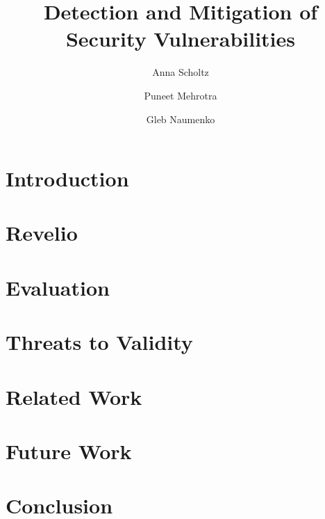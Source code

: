\documentclass[sigconf]{acmart}
\begin{document}
\title{Detection and Mitigation of Security Vulnerabilities}


\author{Anna Scholtz}


\author{Puneet Mehrotra}


\author{Gleb Naumenko}




\begin{abstract}

\end{abstract}





\maketitle

\section{Introduction}
\label{sec:introduction}


\section{Revelio}
\label{sec:revelio}


\section{Evaluation}
\label{sec:evaluation}



\section{Threats to Validity}
\label{sec:threats}



\section{Related Work}
\label{sec:related-work}


\section{Future Work}
\label{sec:future-work}



\section{Conclusion}
\label{sec:conclusion}




\end{document}
